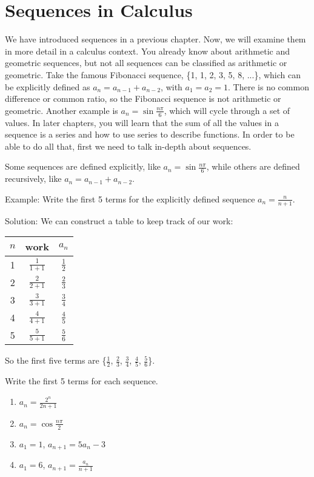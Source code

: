 \chapter{Sequences in Calculus}

We have introduced sequences in a previous chapter. Now, we will 
examine them in more detail in a calculus context. You already know 
about arithmetic and geometric sequences, but not all sequences can 
be classified as arithmetic or geometric. Take the famous Fibonacci 
sequence, \{1, 1, 2, 3, 5, 8, ...\}, which can be explicitly defined 
as $a_n = a_{n-1} + a_{n-2}$, with $a_1 = a_2 = 1$. There is no 
common difference or common ratio, so the Fibonacci sequence is not 
arithmetic or geometric. Another example is $a_n = 
\sin{\frac{n\pi}{6}}$, which will cycle through a set of values. In 
later chapters, you will learn that the sum of all the values in a 
sequence is a series and how to use series to describe functions. In 
order to be able to do all that, first we need to talk in-depth about 
sequences. 

Some sequences are defined explicitly, like $a_n = 
\sin{\frac{n\pi}{6}}$, while others are defined recursively, like $a_n 
= a_{n-1} + a_{n-2}$. 

Example: Write the first 5 terms for the explicitly defined sequence 
$a_n = \frac{n}{n+1}$.

Solution: We can construct a table to keep track of our work:
\begin{center}
\begin{tabular}{|c|c|c|}\hline
$n$ & work & $a_n$\\
\hline
1 & $\frac{1}{1+1}$ & $\frac{1}{2}$\\
\hline
2 & $\frac{2}{2+1}$ & $\frac{2}{3}$\\
\hline
3 & $\frac{3}{3+1}$ & $\frac{3}{4}$\\
\hline
4 & $\frac{4}{4+1}$ & $\frac{4}{5}$\\
\hline
5 & $\frac{5}{5+1}$ & $\frac{5}{6}$\\
\hline
\end{tabular}
\end{center}

So the first five terms are \{$\frac{1}{2}$, $\frac{2}{3}$, 
$\frac{3}{4}$, $\frac{4}{5}$, $\frac{5}{6}$\}. 

\begin{Exercise}[label = seqcalc1]
Write the first 5 terms for each sequence. 
\begin{enumerate}
\item $a_n = \frac{2^n}{2n+1}$
\item $a_n = \cos{\frac{n\pi}{2}}$
\item $a_1 = 1$, $a_{n+1} = 5a_n-3$
\item $a_1 = 6$, $a_{n+1} = \frac{a_n}{n+1}$
\end{enumerate}
\end{Exercise}

